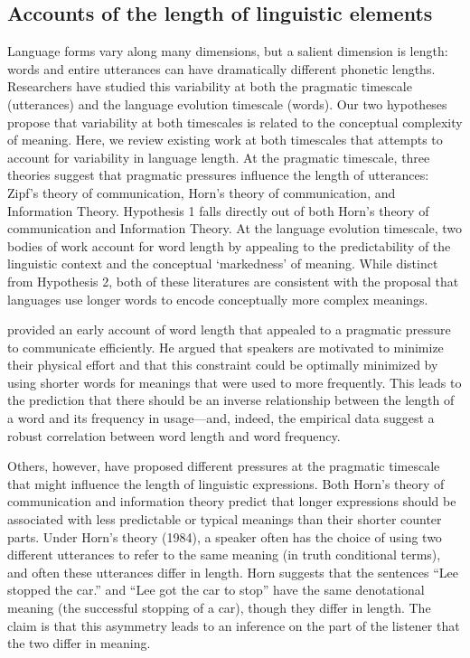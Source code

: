 \documentclass[man]{apa2}
\begin{document}
\subsection{Accounts of the length of linguistic elements}

Language forms vary along many dimensions, but a salient dimension is length: words and entire utterances can have dramatically different phonetic lengths. Researchers have studied this variability at both the pragmatic timescale (utterances) and the language evolution timescale (words). Our two hypotheses propose that variability at both timescales is related to the conceptual complexity of meaning. Here, we review existing work at both timescales that attempts to account for variability in language length. At the pragmatic timescale, three theories suggest that pragmatic pressures influence the length of utterances: Zipf's theory of communication, Horn's theory of communication, and Information Theory. Hypothesis 1 falls directly out of both Horn's theory of communication and Information Theory. At the language evolution timescale, two bodies of work account for word length by appealing to the predictability of the linguistic context and the conceptual `markedness' of meaning. While distinct from Hypothesis 2, both of these literatures are consistent with the proposal that languages use longer words to encode conceptually more complex meanings.

 provided an early account of word length that appealed to a pragmatic pressure to communicate efficiently. He argued that speakers are motivated to minimize their physical effort and that this constraint could be optimally minimized by using shorter words for meanings that were used to more frequently. This leads to the prediction that there should be an inverse relationship between the length of a word and its frequency in usage---and, indeed, the empirical data suggest a robust correlation between word length and word frequency.

Others, however, have proposed different pressures at the pragmatic timescale that might influence the length of linguistic expressions. Both Horn's theory of communication and information theory predict that longer expressions should be associated with less predictable or typical meanings than their shorter counter parts. Under Horn's theory (1984), a speaker often has the choice of using two different utterances to refer to the same meaning (in truth conditional terms), and often these utterances differ in length. Horn suggests that the sentences ``Lee stopped the car.'' and ``Lee got the car to stop'' have the same denotational meaning (the successful stopping of a car), though they differ in length. The claim is that this asymmetry leads to an inference on the part of the listener that the two differ in meaning. 
\end{document}
